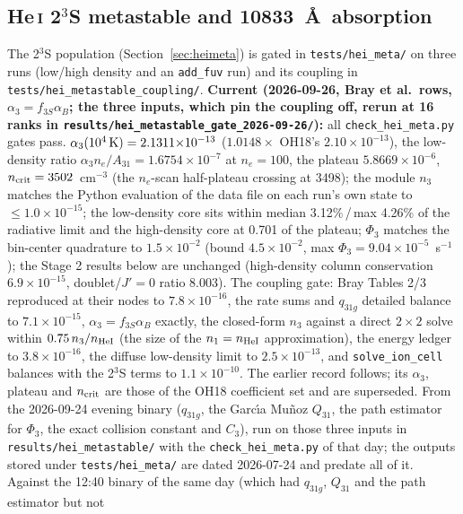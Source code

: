 \documentclass[english,a4paper]{my_memo}
\newcommand{\code}[1]{\texttt{#1}}
\begin{document}
\subsection{He\,\textsc{i} 2$^3$S metastable and 10833~\AA\ absorption}
The 2$^3$S population (Section~\ref{sec:heimeta}) is gated in
\code{tests/hei\_meta/} on three runs (low/high density and an
\code{add\_fuv} run) and its coupling in \code{tests/hei\_metastable\_coupling/}.
\textbf{Current (2026-09-26, Bray et al.\ rows, $\alpha_3 =
f_{3S}\alpha_B$; the three inputs, which pin the coupling off, rerun at 16
ranks in \code{results/hei\_metastable\_gate\_2026-09-26/}):} all
\code{check\_hei\_meta.py} gates pass.  $\alpha_3(10^4\,{\rm K}) =
2.1311{\times}10^{-13}$ ($1.0148\times$ OH18's $2.10{\times}10^{-13}$), the
low-density ratio $\alpha_3n_e/A_{31} = 1.6754{\times}10^{-7}$ at
$n_e = 100$, the plateau $5.8669{\times}10^{-6}$, $n_{\rm crit} =
3502$~cm$^{-3}$ (the $n_e$-scan half-plateau crossing at 3498); the module
$n_3$ matches the Python evaluation of the data file on each run's own
state to $\le1.0{\times}10^{-15}$; the low-density core sits within median
3.12\%\,/\,max 4.26\% of the radiative limit and the high-density core at
0.701 of the plateau; $\Phi_3$ matches the bin-center quadrature to
$1.5{\times}10^{-2}$ (bound $4.5{\times}10^{-2}$, max $\Phi_3 =
9.04{\times}10^{-5}$~s$^{-1}$); the Stage 2 results below are unchanged
(high-density column conservation $6.9{\times}10^{-15}$, doublet/$J'{=}0$
ratio 8.003).  The coupling gate: Bray Tables 2/3 reproduced at their nodes to
$7.8{\times}10^{-16}$, the rate sums and $q_{31g}$ detailed balance to
$7.1{\times}10^{-15}$, $\alpha_3 = f_{3S}\alpha_B$ exactly, the closed-form
$n_3$ against a direct $2\times2$ solve within $0.75\,n_3/n_{\rm HeI}$ (the
size of the $n_1 = n_{\rm HeI}$ approximation), the energy ledger to
$3.8{\times}10^{-16}$, the diffuse low-density limit to
$2.5{\times}10^{-13}$, and \code{solve\_ion\_cell} balances with the
2$^3$S terms to $1.1{\times}10^{-10}$.  The earlier record follows; its
$\alpha_3$, plateau and $n_{\rm crit}$ are those of the OH18 coefficient set
and are superseded.  From the 2026-09-24 evening binary
($q_{31g}$, the Garc\'{\i}a Mu\~noz $Q_{31}$, the path
estimator for $\Phi_3$, the exact collision constant and $C_3$), run on
those three inputs in \code{results/hei\_metastable/} with the
\code{check\_hei\_meta.py} of that day; the outputs stored under \code{tests/hei\_meta/}
are dated 2026-07-24 and predate all of it.  Against the 12:40 binary of
the same day (which had $q_{31g}$, $Q_{31}$ and the path estimator but not
\end{document}
